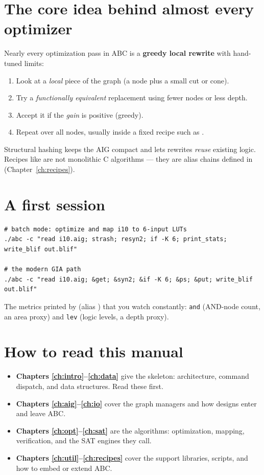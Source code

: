 \section{The core idea behind almost every optimizer}

Nearly every optimization pass in ABC is a \textbf{greedy local rewrite} with
hand-tuned limits:

\begin{enumerate}
  \item Look at a \emph{local} piece of the graph (a node plus a small cut or cone).
  \item Try a \emph{functionally equivalent} replacement using fewer nodes or less depth.
  \item Accept it if the \emph{gain} is positive (greedy).
  \item Repeat over all nodes, usually inside a fixed recipe such as .
\end{enumerate}

Structural hashing keeps the AIG compact and lets rewrites \emph{reuse} existing
logic. Recipes like  are not monolithic C algorithms --- they are
alias chains defined in  (Chapter~\ref{ch:recipes}).

\section{A first session}

\begin{lstlisting}[style=abcshell]
# batch mode: optimize and map i10 to 6-input LUTs
./abc -c "read i10.aig; strash; resyn2; if -K 6; print_stats; write_blif out.blif"

# the modern GIA path
./abc -c "read i10.aig; &get; &syn2; &if -K 6; &ps; &put; write_blif out.blif"
\end{lstlisting}

The metrics printed by  (alias ) that you watch
constantly: \texttt{and} (AND-node count, an area proxy) and \texttt{lev} (logic
levels, a depth proxy).

\section{How to read this manual}

\begin{itemize}
  \item \textbf{Chapters \ref{ch:intro}--\ref{ch:data}} give the skeleton:
        architecture, command dispatch, and data structures. Read these first.
  \item \textbf{Chapters \ref{ch:aig}--\ref{ch:io}} cover the graph managers and
        how designs enter and leave ABC.
  \item \textbf{Chapters \ref{ch:opt}--\ref{ch:sat}} are the algorithms:
        optimization, mapping, verification, and the SAT engines they call.
  \item \textbf{Chapters \ref{ch:util}--\ref{ch:recipes}} cover the support
        libraries, scripts, and how to embed or extend ABC.
\end{itemize}

